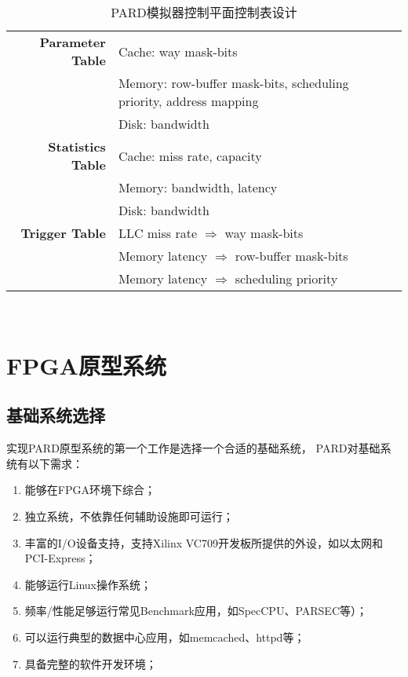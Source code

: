 \begin{table}[ht]
  \centering
  \begin{minipage}[t]{0.9\linewidth}
  \caption{PARD模拟器控制平面控制表设计}
  \label{tab:pard-sim-cp}
    \begin{tabular*}{\linewidth}{rl}
      \toprule[1.5pt]
        \textbf{Parameter Table}  &   Cache: way mask-bits                               \\
                                  &   Memory: row-buffer mask-bits, scheduling priority, address mapping \\
                                  &   Disk: bandwidth                                    \\
        \hline
        \textbf{Statistics Table} &   Cache: miss rate, capacity                         \\
                                  &   Memory: bandwidth, latency                         \\
                                  &   Disk: bandwidth                                    \\
        \hline
        \textbf{Trigger Table}    &   LLC miss rate $\Rightarrow$ way mask-bits          \\
                                  &   Memory latency $\Rightarrow$ row-buffer mask-bits  \\
                                  &   Memory latency $\Rightarrow$ scheduling priority   \\
      \bottomrule[1.5pt]
    \end{tabular*}\\[2pt]
  \end{minipage}
\end{table}

\section{FPGA原型系统}

\subsection{基础系统选择}

实现PARD原型系统的第一个工作是选择一个合适的基础系统，
PARD对基础系统有以下需求：

\begin{enumerate}
  \item 能够在FPGA环境下综合；
  \item 独立系统，不依靠任何辅助设施即可运行；
  \item 丰富的I/O设备支持，支持Xilinx VC709开发板所提供的外设，如以太网和PCI-Express；
  \item 能够运行Linux操作系统；
  \item 频率/性能足够运行常见Benchmark应用，如SpecCPU、PARSEC等）；
  \item 可以运行典型的数据中心应用，如memcached、httpd等；
  \item 具备完整的软件开发环境；
\end{enumerate}

